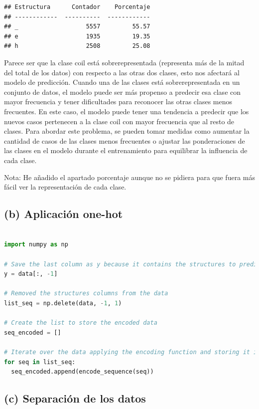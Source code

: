 \documentclass[
]{article}
\begin{document}
\begin{lstlisting}
## Estructura      Contador    Porcentaje
## ------------  ----------  ------------
## _                   5557         55.57
## e                   1935         19.35
## h                   2508         25.08
\end{lstlisting}

Parece ser que la clase coil está sobrerepresentada (representa más de
la mitad del total de los datos) con respecto a las otras dos clases,
esto nos afectará al modelo de predicción. Cuando una de las clases está
sobrerepresentada en un conjunto de datos, el modelo puede ser más
propenso a predecir esa clase con mayor frecuencia y tener dificultades
para reconocer las otras clases menos frecuentes. En este caso, el
modelo puede tener una tendencia a predecir que los nuevos casos
pertenecen a la clase coil con mayor frecuencia que al resto de clases.
Para abordar este problema, se pueden tomar medidas como aumentar la
cantidad de casos de las clases menos frecuentes o ajustar las
ponderaciones de las clases en el modelo durante el entrenamiento para
equilibrar la influencia de cada clase.

Nota: He añadido el apartado porcentaje aunque no se pidiera para que
fuera más fácil ver la representación de cada clase.

\hypertarget{b-aplicaciuxf3n-one-hot}{%
\subsection{(b) Aplicación one-hot}\label{b-aplicaciuxf3n-one-hot}}

\begin{lstlisting}[language=Python]

import numpy as np

# Save the last column as y because it contains the structures to predict
y = data[:, -1]

# Removed the structures columns from the data
list_seq = np.delete(data, -1, 1)

# Create the list to store the encoded data
seq_encoded = []

# Iterate over the data applying the encoding function and storing it in the list
for seq in list_seq:
  seq_encoded.append(encode_sequence(seq))
\end{lstlisting}

\hypertarget{c-separaciuxf3n-de-los-datos}{%
\subsection{(c) Separación de los
datos}\label{c-separaciuxf3n-de-los-datos}}
\end{document}

